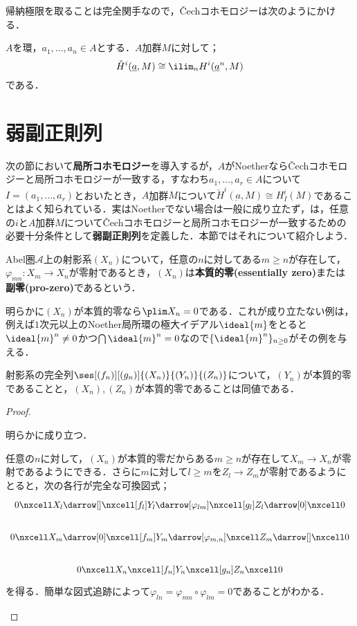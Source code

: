 帰納極限を取ることは完全関手なので，Čechコホモロジーは次のようにかける．

\begin{cor}
	$A$を環，$a_1,\dots,a_n\in A$とする．$A$加群$M$に対して；
	\[\check{H}^i(\underline{a},M)\cong\ilim_{n}H^i(\underline{a}^n,M)\]
	である．
\end{cor}

\section{弱副正則列}
次の節において\textbf{局所コホモロジー}を導入するが，$A$がNoetherなら\v{C}echコホモロジーと局所コホモロジーが一致する，すなわち$a_1,\dots,a_r\in A$について$I=(a_1,\dots,a_r)$とおいたとき，$A$加群$M$について$\check{H}^i(\underbar{a},M)\cong H^i_I(M)$であることはよく知られている．実はNoetherでない場合は一般に成り立たず，\cite{Schenzel2003}は，任意の$i$と$A$加群$M$について\v{C}echコホモロジーと局所コホモロジーが一致するための必要十分条件として\textbf{弱副正則列}を定義した．本節ではそれについて紹介しよう．

\begin{defi}[本質的零]
	Abel圏$\mathscr{A}$上の射影系$(X_n)$について，任意の$n$に対してある$m\geq n$が存在して，$\varphi_{mn}:X_m\to X_n$が零射であるとき，$(X_n)$は\textbf{本質的零(essentially zero)}または\textbf{副零(pro-zero)}であるという．
\end{defi}

明らかに$(X_n)$が本質的零なら$\plim X_n=0$である．これが成り立たない例は，例えば$1$次元以上のNoether局所環の極大イデアル$\ideal{m}$をとると$\ideal{m}^n\neq 0$かつ$\bigcap\ideal{m}^n=0$なので$\{\ideal{m}^n\}_{n\geq 0}$がその例を与える．

\begin{prop}
	射影系の完全列$\ses[(f_n)][(g_n)]{(X_n)}{(Y_n)}{(Z_n)}$について，$(Y_n)$が本質的零であることと，$(X_n),(Z_n)$が本質的零であることは同値である．
\end{prop}

\begin{proof}
	\begin{eqv}
		\item 明らかに成り立つ．
		\item 任意の$n$に対して，$(X_n)$が本質的零だからある$m\geq n$が存在して$X_m\to X_n$が零射であるようにできる．さらに$m$に対して$l\geq m$を$Z_l\to Z_m$が零射であるようにとると，次の各行が完全な可換図式；
		\[\begin{tikzcd}
			0\nxcell X_{l}\darrow[]\nxcell[f_{l}] Y_{l}\darrow[\varphi_{lm}]\nxcell[g_{l}]Z_{l}\darrow[0]\nxcell 0\\
			0\nxcell X_m\darrow[0]\nxcell[f_m]Y_m\darrow[\varphi_{m,n}]\nxcell Z_m\darrow[]\nxcell0\\
			0\nxcell X_n\nxcell[f_n]Y_n\nxcell[g_n]Z_n\nxcell0
		\end{tikzcd}\]
		を得る．簡単な図式追跡によって$\varphi_{ln}=\varphi_{mn}\circ\varphi_{lm}=0$であることがわかる．
	\end{eqv}
\end{proof}

